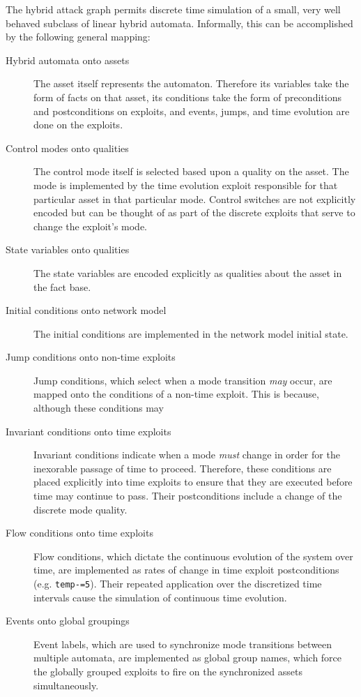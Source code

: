 The hybrid attack graph permits discrete time
simulation of a small, very well behaved subclass of linear hybrid automata. 
Informally, this can be accomplished by the following general mapping:
\begin{description}
\item[Hybrid automata onto assets] The asset itself represents the automaton.
    Therefore its variables take the form of facts on that asset, its
    conditions take the form of preconditions and postconditions on exploits,
    and events, jumps, and time evolution are done on the exploits.
\item[Control modes onto qualities] The control mode itself is selected based
    upon a quality on the asset. The mode is implemented by the time
    evolution exploit responsible for that particular asset in that
    particular mode. Control switches are not explicitly encoded but can be
    thought of as part of the discrete exploits that serve to change the
    exploit's mode.
\item[State variables onto qualities] The state variables are encoded
    explicitly as qualities about the asset in the fact base.
\item[Initial conditions onto network model] The initial conditions are
    implemented in the network model initial state.
\item[Jump conditions onto non-time exploits] Jump conditions,
    which select when a mode transition \emph{may} occur, are mapped onto
    the conditions of a non-time exploit. This is because, although these
    conditions may 
\item[Invariant conditions onto time exploits] Invariant conditions indicate
    when a mode \emph{must} change in order for the inexorable passage of time
    to proceed. Therefore, these conditions are placed explicitly into time 
    exploits to ensure that they are executed before time may continue to pass.
    Their postconditions include a change of the discrete mode quality.
\item[Flow conditions onto time exploits] Flow conditions, which dictate the
    continuous evolution of the system over time, are implemented as rates of
    change in time exploit postconditions (e.g. \texttt{temp-=5}). Their
    repeated application over the discretized time intervals cause the
    simulation of continuous time evolution.
\item[Events onto global groupings] Event labels, which are used to synchronize
    mode transitions between multiple automata, are implemented as global group
    names, which force the globally grouped exploits to fire on the
    synchronized assets simultaneously.
\end{description}

